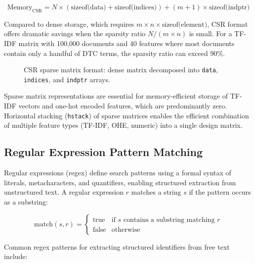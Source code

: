 \documentclass[10pt,a4paper]{article}
\begin{document}
\begin{equation}
\text{Memory}_{\text{CSR}} = N \times (\text{sizeof(data)} + \text{sizeof(indices)}) + (m+1) \times \text{sizeof(indptr)}
\label{eq:csr-memory}
\end{equation}

Compared to dense storage, which requires $m \times n \times \text{sizeof(element)}$, CSR format offers dramatic savings when the sparsity ratio $N/(m \times n)$ is small. For a TF-IDF matrix with 100,000 documents and 40 features where most documents contain only a handful of DTC terms, the sparsity ratio can exceed 90\%.

\begin{figure}[H]
    \centering
    \caption{CSR sparse matrix format: dense matrix decomposed into \texttt{data}, \texttt{indices}, and \texttt{indptr} arrays.}
    \label{fig:csr-format}
\end{figure}

Sparse matrix representations are essential for memory-efficient storage of TF-IDF vectors and one-hot encoded features, which are predominantly zero. Horizontal stacking (\texttt{hstack}) of sparse matrices enables the efficient combination of multiple feature types (TF-IDF, OHE, numeric) into a single design matrix.

\subsection{Regular Expression Pattern Matching}
\label{sec:regex}

Regular expressions (regex) define search patterns using a formal syntax of literals, metacharacters, and quantifiers, enabling structured extraction from unstructured text. A regular expression $r$ matches a string $s$ if the pattern occurs as a substring:

\begin{equation}
\text{match}(s, r) = \begin{cases} \text{true} & \text{if } s \text{ contains a substring matching } r \\ \text{false} & \text{otherwise} \end{cases}
\label{eq:regex-match}
\end{equation}

Common regex patterns for extracting structured identifiers from free text include:
\end{document}
